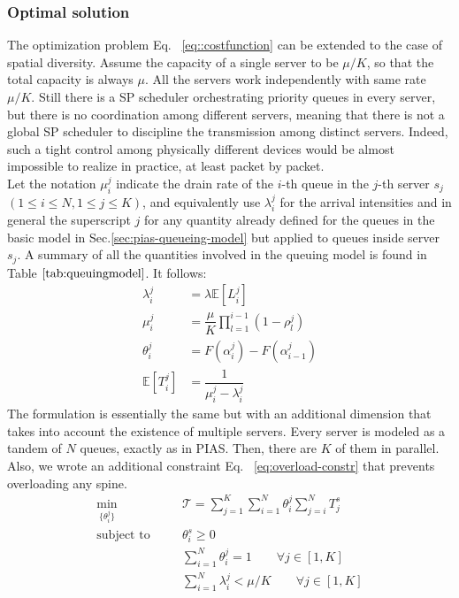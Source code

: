 \subsubsection{Optimal solution}
\label{sec:optimal-joint-solution}
The optimization problem Eq. ~\eqref{eq::costfunction} can be extended to the case of spatial diversity.
Assume the capacity of a single server to be $\mu/K$, so that the total capacity is always $\mu$. All the servers work independently with same rate $\mu / K$. Still there is a SP scheduler orchestrating priority queues in every server, but there is no coordination among different servers, meaning that there is not a global SP scheduler to discipline the transmission among distinct servers. Indeed, such a tight control among physically different devices would be almost impossible to realize in practice, at least packet by packet. \\
Let the notation $\mu_i^j$ indicate the drain rate of the $i$-th queue in the $j$-th server $s_j$ $(1 \le i \le N, 1 \le j \le K)$, and equivalently use $\lambda_i^j$ for the arrival intensities and in general the superscript $j$ for any quantity already defined for the queues in the basic model in Sec.\ref{sec:pias-queueing-model} but applied to queues inside server $s_j$. A summary of all the quantities involved in the queuing model is found in Table $\ref{tab:queuingmodel}$. It follows:
\begin{align*}
\lambda_i^j &= \lambda \mathbb{E}[L_i^j] \\
\mu_i^j &=  \dfrac{\mu}{K} \prod_{l=1}^{i-1}(1-\rho_l^j) \\
\theta_i^j &= F(\alpha_i^j) - F(\alpha_{i-1}^j)	\\
\mathbb{E}[T_i^j] &= \dfrac{1}{\mu_i^j - \lambda_i^j}
\end{align*}
The formulation is essentially the same but with an additional dimension that takes into account the existence of multiple servers. Every server is modeled as a tandem of $N$ queues, exactly as in PIAS. Then, there are $K$ of them in parallel. Also, we wrote an additional constraint Eq. ~\eqref{eq:overload-constr} that prevents overloading any spine.
\begin{subequations}
	\begin{align}
	&\underset{\{\theta_i^j\}}{\text{min}} & \quad  & \mathcal{T} =	\sum_{j=1}^{K}\sum_{i=1}^{N} \theta_i^j \sum_{j=i}^{N}T^s_j 					\label{eq::costfunction-spatial} & \\
	&\text{subject to} & \quad  &\theta_i^s \ge 0 & \\
	& & & \sum_{i=1}^{N} \theta_i^j = 1  \qquad \forall j \in [1,K] &  \\
	& & & \sum_{i=1}^{N}  \lambda_i^j < \mu/K  \qquad \forall j \in [1,K] & \label{eq:overload-constr}
	\end{align}
\end{subequations}
